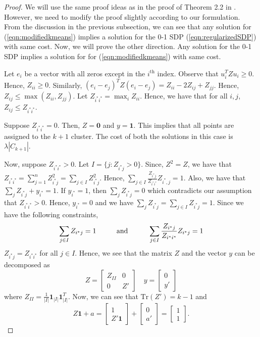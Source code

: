 \documentclass[12pt]{article}
\newcommand{\mb}{\mathbf}
\newcommand{\tr}{\text{Tr}}
\begin{document}
\begin{proof}
We will use the same proof ideas as in the proof of Theorem 2.2 in \cite{peng2007approximating}. However, we need to modify the proof slightly according to our formulation. From the discussion in the previous subsection, we can see that any solution for (\ref{eqn:modifiedkmeans}) implies a solution for the 0-1 SDP (\ref{eqn:regularizedSDP}) with same cost. Now, we will prove the other direction. Any solution for the 0-1 SDP implies a solution for for (\ref{eqn:modifiedkmeans}) with same cost.

Let $e_i$ be a vector with all zeros except in the $i^{\text{th}}$ index. Observe that $u_i^T Z u_i \ge 0$. Hence, $Z_{ii} \ge 0$. Similarly, $(e_i-e_j)^T Z (e_i-e_j) = Z_{ii} - 2Z_{ij} + Z_{jj}$. Hence, $Z_{ij} \le \max (Z_{ii}, Z_{jj})$. Let $Z_{i^*i^*} = \max_i Z_{ii}$. Hence, we have that for all $i, j$, $Z_{ij} \le Z_{i^* i^*}$. 

Suppose $Z_{i^*i^*} = 0$. Then, $Z = \textbf{0}$ and $y = \textbf{1}$. This implies that all points are assigned to the $k+1$ cluster. The cost of both the solutions in this case is $\lambda |C_{k+1}|$.

Now, suppose $Z_{i^*i^*}>0$. Let $I =\{j: Z_{i^* j} > 0\}$. Since, $Z^2 = Z$, we have that $Z_{i^*i^*} = \sum_{j=1}^n Z^2_{i^* j} = \sum_{j \in I} Z^2_{i^*j}$. Hence, $\sum_{j \in I}\frac{Z_{i^*j}}{Z_{i^*i^*}}Z_{i^*, j} = 1$. Also, we have that $\sum_{j} Z_{i^*j} + y_{i^*} = 1$. If $y_{i^*} = 1$, then $\sum_{j} Z_{i^*j} = 0$ which contradicts our assumption that $Z_{i^*i^*} > 0$. Hence, $y_{i^*} = 0$ and we have $\sum_{j} Z_{i^*j} = \sum_{j\in I} Z_{i^*j} = 1$. Since we have the following constraints,
\begin{align*}
	\sum_{j\in I} Z_{i^*j} = 1 \hspace{0.4in}\text{and} \hspace{0.4in}\sum_{j\in I} \frac{Z_{i^*j}}{Z_{i^*i^*}}Z_{i^*j} = 1
\end{align*}
$Z_{i^*j} = Z_{i^*i^*}$ for all $j \in I$. Hence, we see that the matrix $Z$ and the vector $y$ can be decomposed as 
\[ Z = 
\begin{bmatrix}
    Z_{II}  & 0 \\
    0       & Z'
\end{bmatrix}
\quad y=\begin{bmatrix}
    0 \\
    y' 
\end{bmatrix}
\]
where $Z_{II} = \frac{1}{|I|}\mb1_{|I|}\mb1_{|I|}^T$. Now, we can see that $\tr(Z') = k-1$ and
$$Z\mb 1 + a = \begin{bmatrix}1\\Z'\mb 1\end{bmatrix} + \begin{bmatrix}0\\a'\end{bmatrix} = \begin{bmatrix}1\\1\end{bmatrix}.$$


\end{proof}
\end{document}
